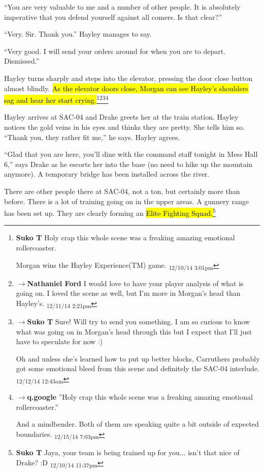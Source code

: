 ``You are very valuable to me and a number of other people.  It is absolutely imperative that you defend yourself against all comers.  Is that clear?''

``Very.  Sir.  Thank you.''  Hayley manages to say.

``Very good.  I will send your orders around for when you are to depart.  Dismissed.''

Hayley turns sharply and steps into the elevator, pressing the door close button almost blindly.  \hl{As the elevator doors close, Morgan can see Hayley's shoulders sag and hear her start crying.}\footnote{\textbf{Suko T }Holy crap this whole scene was a freaking amazing emotional rollercoaster.

Morgan wins the Hayley Experience(TM) game. \textsubscript{12/10/14 3:01pm}}\footnote{$\rightarrow$\textbf{Nathaniel Ford }I would love to have your player analysis of what is going on. I loved the scene as well, but I'm more in Morgan's head than Hayley's. \textsubscript{12/11/14 2:21pm}}\footnote{$\rightarrow$\textbf{Suko T }Sure!  Will try to send you something.  I am so curious to know what was going on in Morgan's head through this but I expect that I'll just have to speculate for now :)

Oh and unless she's learned how to put up better blocks, Carruthers probably got some emotional bleed from this scene and definitely the SAC-04 interlude. \textsubscript{12/12/14 12:43am}}\footnote{$\rightarrow$\textbf{q.google }''Holy crap this whole scene was a freaking amazing emotional rollercoaster.''

And a mindbender.  Both of them are speaking quite a bit outside of expected boundaries. \textsubscript{12/15/14 7:03pm}}



Hayley arrives at SAC-04 and Drake greets her at the train station.  Hayley notices the gold veins in his eyes and thinks they are pretty.  She tells him so.  ``Thank you, they rather fit me,'' he says.  Hayley agrees.  



``Glad that you are here, you'll dine with the command staff tonight in Mess Hall 6,'' says Drake as he escorts her into the base (no need to hike up the mountain anymore).  A temporary bridge has been installed across the river.



There are other people there at SAC-04, not a ton, but certainly more than before.  There is a lot of training going on in the upper areas.  A gunnery range has been set up.  They are clearly forming an \hl{Elite Fighting Squad.}\footnote{\textbf{Suko T }Jaya, your team is being trained up for you... isn't that nice of Drake? :D \textsubscript{12/10/14 11:37pm}}



